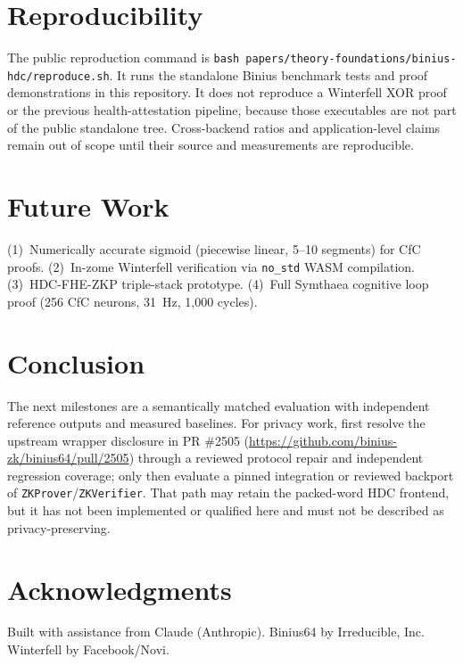 \documentclass[11pt,twocolumn]{article}
\begin{document}
\section{Reproducibility}

The public reproduction command is \texttt{bash papers/theory-foundations/binius-hdc/reproduce.sh}. It runs the standalone Binius benchmark tests and proof demonstrations in this repository. It does not reproduce a Winterfell XOR proof or the previous health-attestation pipeline, because those executables are not part of the public standalone tree. Cross-backend ratios and application-level claims remain out of scope until their source and measurements are reproducible.

\section{Future Work}

(1)~Numerically accurate sigmoid (piecewise linear, 5--10 segments) for CfC proofs. (2)~In-zome Winterfell verification via \texttt{no\_std} WASM compilation. (3)~HDC-FHE-ZKP triple-stack prototype. (4)~Full Symthaea cognitive loop proof (256 CfC neurons, 31~Hz, 1,000 cycles).

\section{Conclusion}

The next milestones are a semantically matched evaluation with independent reference outputs and measured baselines. For privacy work, first resolve the upstream wrapper disclosure in PR \#2505 (\url{https://github.com/binius-zk/binius64/pull/2505}) through a reviewed protocol repair and independent regression coverage; only then evaluate a pinned integration or reviewed backport of \texttt{ZKProver}/\texttt{ZKVerifier}. That path may retain the packed-word HDC frontend, but it has not been implemented or qualified here and must not be described as privacy-preserving.

\section*{Acknowledgments}
Built with assistance from Claude (Anthropic). Binius64 by Irreducible, Inc. Winterfell by Facebook/Novi.
\end{document}
